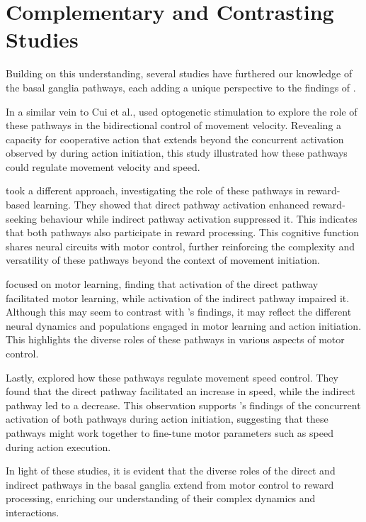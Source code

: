 \documentclass[10pt]{article}
\begin{document}
\begin{sloppypar}
  \section{Complementary and Contrasting Studies}
  \label{sec:complementary-and-contrasting-studies}

  Building on this understanding, several studies have furthered our knowledge of the basal ganglia pathways, each adding a unique perspective to the findings of \cite{cui_concurrent_2013}.

  In a similar vein to Cui et al., \cite{yttri_opponent_2016} used optogenetic stimulation to explore the role of these pathways in the bidirectional control of movement velocity. Revealing a capacity for cooperative action that extends beyond the concurrent activation observed by \cite{cui_concurrent_2013} during action initiation, this study illustrated how these pathways could regulate movement velocity and speed.

  \cite{guillaumin_experimental_2021} took a different approach, investigating the role of these pathways in reward-based learning. They showed that direct pathway activation enhanced reward-seeking behaviour while indirect pathway activation suppressed it. This indicates that both pathways also participate in reward processing. This cognitive function shares neural circuits with motor control, further reinforcing the complexity and versatility of these pathways beyond the context of movement initiation.

  \cite{hilt_evidence_2016} focused on motor learning, finding that activation of the direct pathway facilitated motor learning, while activation of the indirect pathway impaired it. Although this may seem to contrast with \cite{cui_concurrent_2013}’s findings, it may reflect the different neural dynamics and populations engaged in motor learning and action initiation. This highlights the diverse roles of these pathways in various aspects of motor control.

  Lastly, \cite{wang_direct_2015} explored how these pathways regulate movement speed control. They found that the direct pathway facilitated an increase in speed, while the indirect pathway led to a decrease. This observation supports \cite{cui_concurrent_2013}’s findings of the concurrent activation of both pathways during action initiation, suggesting that these pathways might work together to fine-tune motor parameters such as speed during action execution.

  In light of these studies, it is evident that the diverse roles of the direct and indirect pathways in the basal ganglia extend from motor control to reward processing, enriching our understanding of their complex dynamics and interactions.


\end{sloppypar}
\end{document}
